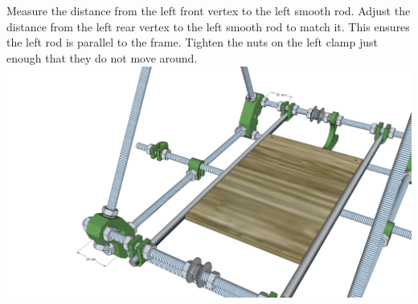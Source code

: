 \documentclass[twoside,a4paper,titlepage]{memoir}
\begin{document}
	\section{}
	Measure the distance from the left front vertex to the left smooth rod. Adjust the distance from the left
	rear vertex to the left smooth rod to match it. This ensures the left rod is parallel to the frame. Tighten
	the nuts on the left clamp just enough that they do not move around.\\
	\includegraphics[width=1\linewidth]{graphics/ch6_7_1.png}
\end{document}
